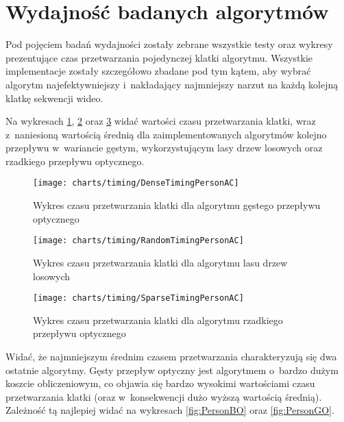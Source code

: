   \section{Wydajność badanych algorytmów}\label{Section_Timing}

    Pod pojęciem badań wydajności zostały zebrane wszystkie testy oraz wykresy prezentujące czas przetwarzania pojedynczej klatki algorytmu. Wszystkie implementacje zostały szczegółowo zbadane pod tym kątem, aby wybrać algorytm najefektywniejszy i~nakładający najmniejszy narzut na każdą kolejną klatkę sekwencji wideo.

    Na wykresach \ref{fig:DenseTimingPersonAC}, \ref{fig:RandomTimingPersonAC} oraz \ref{fig:SparseTimingPersonAC} widać wartości czasu przetwarzania klatki, wraz z~naniesioną wartością średnią dla zaimplementowanych algorytmów kolejno przepływu w~wariancie gęstym, wykorzystującym lasy drzew losowych oraz rzadkiego przepływu optycznego.

      \begin{figure}[!ht]
        \centering
        \texttt{[image: charts/timing/DenseTimingPersonAC]}
        \caption[Wykres czasu przetwarzania klatki dla algorytmu gęstego przepływu optycznego]
                {Wykres czasu przetwarzania klatki dla algorytmu gęstego przepływu optycznego}
        \label{fig:DenseTimingPersonAC}
      \end{figure}

    \newpage
      \begin{figure}[!ht]
        \centering
        \texttt{[image: charts/timing/RandomTimingPersonAC]}
        \caption[Wykres czasu przetwarzania klatki dla algorytmu lasu drzew losowych]
                {Wykres czasu przetwarzania klatki dla algorytmu lasu drzew losowych}
        \label{fig:RandomTimingPersonAC}
      \end{figure}

      \begin{figure}[!ht]
        \centering
        \texttt{[image: charts/timing/SparseTimingPersonAC]}
        \caption[Wykres czasu przetwarzania klatki dla algorytmu rzadkiego przepływu optycznego]
                {Wykres czasu przetwarzania klatki dla algorytmu rzadkiego przepływu optycznego}
        \label{fig:SparseTimingPersonAC}
      \end{figure}

    Widać, że najmniejszym średnim czasem przetwarzania charakteryzują się dwa ostatnie algorytmy. Gęsty przepływ optyczny jest algorytmem o~bardzo dużym koszcie obliczeniowym, co objawia się bardzo wysokimi wartościami czasu przetwarzania klatki (oraz w~konsekwencji dużo wyższą wartością średnią). Zależność tą najlepiej widać na wykresach \ref{fig:PersonBO} oraz \ref{fig:PersonGO}.

